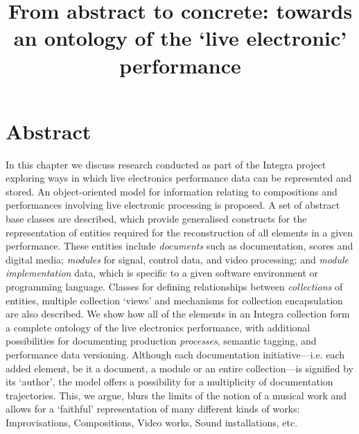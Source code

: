 \documentclass{article}
\begin{document}
\title{From abstract to concrete: towards an ontology of the `live electronic' performance}
\date{}
\maketitle


\section*{Abstract}
\label{sec:abstract}

In this chapter we discuss research conducted as part of the Integra project exploring ways in which live electronics performance data can be represented and stored. An object-oriented model for information relating to compositions and performances involving live electronic processing is proposed. A set of abstract base classes are described, which provide generalised constructs for the representation of entities required for the reconstruction of all elements in a given performance. These entities include {\it documents} such as documentation, scores and digital media; {\it modules} for signal, control data, and video processing; and {\it module implementation} data, which is specific to a given software environment or programming language. Classes for defining relationships between {\it collections} of entities, multiple collection `views' and mechanisms for collection encapsulation are also described. We show how all of the elements in an Integra collection form a complete ontology of the live electronics performance, with additional possibilities for documenting production {\it processes}, semantic tagging, and performance data versioning. Although each documentation initiative---i.e. each added element, be it a document, a module or an entire collection---is signified by its `author', the model offers a possibility for a multiplicity of documentation trajectories. This, we argue, blurs the limits of the notion of a musical work and allows for a `faithful' representation of many different kinds of works: Improvisations, Compositions, Video works, Sound installations, etc.
\end{document}
